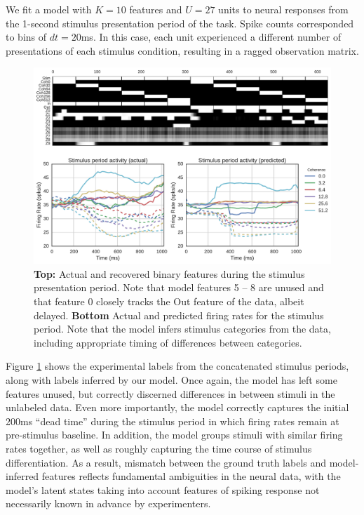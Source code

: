 \documentclass{article} %
\begin{document}
We fit a model with $K = 10$ features and $U = 27$ units to neural responses from the 1-second stimulus presentation period of the task. Spike counts corresponded to bins of $dt = 20$ms. In this case, each unit experienced a different number of presentations of each stimulus condition, resulting in a ragged observation matrix.

\begin{figure}[ht]
    \center
    \includegraphics[width=0.7\linewidth]{figures/roitman}
    \caption{\textbf{Top:} Actual and recovered binary features during the stimulus presentation period. Note that model features 5 -- 8 are unused and that feature 0 closely tracks the Out feature of the data, albeit delayed. \textbf{Bottom} Actual and predicted firing rates for the stimulus period. Note that the model infers stimulus categories from the data, including appropriate timing of differences between categories.}
    \label{roitman}
\end{figure}
Figure \ref{roitman} shows the experimental labels from the concatenated stimulus periods, along with labels inferred by our model. Once again, the model has left some features unused, but correctly discerned differences in between stimuli in the unlabeled data. Even more importantly, the model correctly captures the initial 200ms ``dead time'' during the stimulus period in which firing rates remain at pre-stimulus baseline. In addition, the model groups stimuli with similar firing rates together, as well as roughly capturing the time course of stimulus differentiation. As a result, mismatch between the ground truth labels and model-inferred features reflects fundamental ambiguities in the neural data, with the model's latent states taking into account features of spiking response not necessarily known in advance by experimenters.
\end{document}
